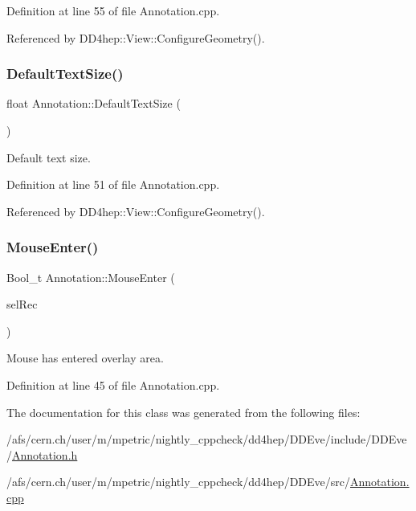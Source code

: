 Definition at line 55 of file Annotation.\+cpp.



Referenced by D\+D4hep\+::\+View\+::\+Configure\+Geometry().

\hypertarget{class_d_d4hep_1_1_annotation_a935265c70c04d194c2de49408f860db6}{}\label{class_d_d4hep_1_1_annotation_a935265c70c04d194c2de49408f860db6} 
\subsubsection{\texorpdfstring{Default\+Text\+Size()}{DefaultTextSize()}}
{\footnotesize\ttfamily float Annotation\+::\+Default\+Text\+Size (\begin{DoxyParamCaption}{ }\end{DoxyParamCaption})\hspace{0.3cm}{\ttfamily [static]}}



Default text size. 



Definition at line 51 of file Annotation.\+cpp.



Referenced by D\+D4hep\+::\+View\+::\+Configure\+Geometry().

\hypertarget{class_d_d4hep_1_1_annotation_a08d3cc154321a9410f62e38d42a918f0}{}\label{class_d_d4hep_1_1_annotation_a08d3cc154321a9410f62e38d42a918f0} 
\subsubsection{\texorpdfstring{Mouse\+Enter()}{MouseEnter()}}
{\footnotesize\ttfamily Bool\+\_\+t Annotation\+::\+Mouse\+Enter (\begin{DoxyParamCaption}\item[{T\+G\+L\+Ovl\+Select\+Record \&}]{sel\+Rec }\end{DoxyParamCaption})\hspace{0.3cm}{\ttfamily [virtual]}}



Mouse has entered overlay area. 



Definition at line 45 of file Annotation.\+cpp.



The documentation for this class was generated from the following files\+:\begin{DoxyCompactItemize}
\item 
/afs/cern.\+ch/user/m/mpetric/nightly\+\_\+cppcheck/dd4hep/\+D\+D\+Eve/include/\+D\+D\+Eve/\hyperlink{_annotation_8h}{Annotation.\+h}\item 
/afs/cern.\+ch/user/m/mpetric/nightly\+\_\+cppcheck/dd4hep/\+D\+D\+Eve/src/\hyperlink{_annotation_8cpp}{Annotation.\+cpp}\end{DoxyCompactItemize}
